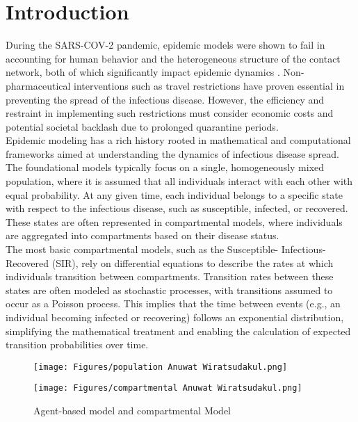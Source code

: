 % 

\section{Introduction}

During the SARS-COV-2 pandemic, epidemic models were shown to fail in accounting for human behavior and the heterogeneous structure of the contact network, both of which significantly impact epidemic dynamics \cite{Lewis2021wrong}. Non-pharmaceutical interventions such as travel restrictions have proven essential in preventing the spread of the infectious disease\cite{bajardi2011human}. However, the efficiency and restraint in implementing such restrictions must consider economic costs and potential societal backlash due to prolonged quarantine periods\cite{fenichel2013economic}.\\ 

Epidemic modeling has a rich history rooted in mathematical and computational frameworks aimed at understanding the dynamics of infectious disease spread. The foundational models typically focus on a single, homogeneously mixed population, where it is assumed that all individuals interact with each other with equal probability. At any given time, each individual belongs to a specific state with respect to the infectious disease, such as susceptible, infected, or recovered. These states are often represented in compartmental models, where individuals are aggregated into compartments based on their disease status. \cite{brauer2008compartmental}\\

The most basic compartmental models, such as the Susceptible- Infectious- Recovered (SIR), rely on differential equations to describe the rates at which individuals transition between compartments. Transition rates between these states are often modeled as stochastic processes, with transitions assumed to occur as a Poisson process. This implies that the time between events (e.g., an individual becoming infected or recovering) follows an exponential distribution, simplifying the mathematical treatment and enabling the calculation of expected transition probabilities over time.\\

\begin{figure}[h]
    \centering
    \begin{minipage}{0.45\textwidth}
        \centering
        \texttt{[image: Figures/population Anuwat Wiratsudakul.png]}
    \end{minipage}
    \hfill
    \begin{minipage}{0.45\textwidth}
        \centering
        \texttt{[image: Figures/compartmental Anuwat Wiratsudakul.png]}
    \end{minipage}
    \caption{Agent-based model and compartmental Model \cite{wiratsudakul2018dynamics}}
\end{figure}

